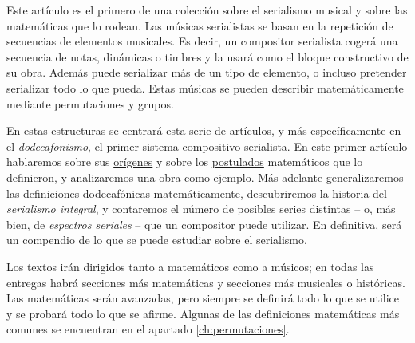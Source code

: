 \documentclass[]{article}
\begin{document}
	
	Este artículo es el primero de una colección sobre el serialismo musical y sobre las matemáticas que lo rodean. Las músicas serialistas se basan en la repetición de secuencias de elementos musicales. Es decir, un compositor serialista cogerá una secuencia de notas, dinámicas o timbres y la usará como el bloque constructivo de su obra. Además puede serializar más de un tipo de elemento, o incluso pretender serializar todo lo que pueda. Estas músicas se pueden describir matemáticamente mediante permutaciones y grupos.
	
	En estas estructuras se centrará esta serie de artículos, y más específicamente en el \textit{dodecafonismo}, el primer sistema compositivo serialista. En este primer artículo hablaremos sobre sus \hyperref[ch:historia]{orígenes} y sobre los \hyperref[ch:dodecafonismo]{postulados} matemáticos que lo definieron, y \hyperref[ch:suite]{analizaremos} una obra como ejemplo. Más adelante generalizaremos las definiciones dodecafónicas matemáticamente, descubriremos la historia del \textit{serialismo integral}, y contaremos el número de posibles series distintas -- o, más bien, de \textit{espectros seriales} -- que un compositor puede utilizar. En definitiva, será un compendio de lo que se puede estudiar sobre el serialismo.
	
	Los textos irán dirigidos tanto a matemáticos como a músicos; en todas las entregas habrá secciones más matemáticas y secciones más musicales o históricas. Las matemáticas serán avanzadas, pero siempre se definirá todo lo que se utilice y se probará todo lo que se afirme. Algunas de las definiciones matemáticas más comunes se encuentran en el apartado \ref{ch:permutaciones}.
	
	
	
\end{document}
